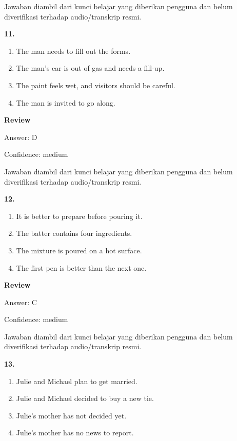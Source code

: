 \documentclass[12pt]{article}
\begin{document}
Jawaban diambil dari kunci belajar yang diberikan pengguna dan belum diverifikasi terhadap audio/transkrip resmi.\par
\endgroup
\par
\vspace{0.25\baselineskip}
\noindent\textbf{11.}
\begin{enumerate}[label=(\Alph*),leftmargin=*,itemsep=0.2em]
\item The man needs to fill out the forms.
\item The man's car is out of gas and needs a fill-up.
\item The paint feels wet, and visitors should be careful.
\item The man is invited to go along.
\end{enumerate}
\par
\begingroup
\setlength{\parskip}{0pt}
\setlength{\parindent}{0pt}
\textbf{Review}\par
Answer: D\par
Confidence: medium\par
Jawaban diambil dari kunci belajar yang diberikan pengguna dan belum diverifikasi terhadap audio/transkrip resmi.\par
\endgroup
\par
\vspace{0.25\baselineskip}
\noindent\textbf{12.}
\begin{enumerate}[label=(\Alph*),leftmargin=*,itemsep=0.2em]
\item It is better to prepare before pouring it.
\item The batter contains four ingredients.
\item The mixture is poured on a hot surface.
\item The first pen is better than the next one.
\end{enumerate}
\par
\begingroup
\setlength{\parskip}{0pt}
\setlength{\parindent}{0pt}
\textbf{Review}\par
Answer: C\par
Confidence: medium\par
Jawaban diambil dari kunci belajar yang diberikan pengguna dan belum diverifikasi terhadap audio/transkrip resmi.\par
\endgroup
\par
\vspace{0.25\baselineskip}
\noindent\textbf{13.}
\begin{enumerate}[label=(\Alph*),leftmargin=*,itemsep=0.2em]
\item Julie and Michael plan to get married.
\item Julie and Michael decided to buy a new tie.
\item Julie's mother has not decided yet.
\item Julie's mother has no news to report.
\end{enumerate}
\end{document}
